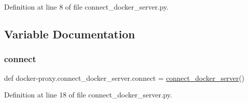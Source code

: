 Definition at line 8 of file connect\+\_\+docker\+\_\+server.\+py.



\subsection{Variable Documentation}
\hypertarget{namespacedocker-proxy_1_1connect__docker__server_aa7f3f87149d03ba3fd92b1b60a011454}{}\label{namespacedocker-proxy_1_1connect__docker__server_aa7f3f87149d03ba3fd92b1b60a011454} 
\subsubsection{\texorpdfstring{connect}{connect}}
{\footnotesize\ttfamily def docker-\/proxy.\+connect\+\_\+docker\+\_\+server.\+connect = \hyperlink{namespacedocker-proxy_1_1connect__docker__server_a5a405d25b986678755c9a1aedeb066f8}{connect\+\_\+docker\+\_\+server}()}



Definition at line 18 of file connect\+\_\+docker\+\_\+server.\+py.

